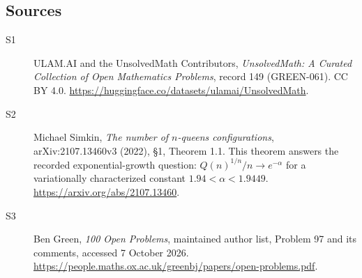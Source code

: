 \documentclass[11pt]{article}
\begin{document}
\subsection{Sources}
\begin{description}
\item[\hypertarget{source:149:1}{S1}] ULAM.AI and the UnsolvedMath Contributors, \emph{UnsolvedMath: A Curated Collection of Open Mathematics Problems}, record 149 (GREEN-061). CC BY 4.0. \url{https://huggingface.co/datasets/ulamai/UnsolvedMath}.
\item[\hypertarget{source:149:2}{S2}] Michael Simkin, \emph{The number of $n$-queens configurations}, arXiv:2107.13460v3 (2022), §1, Theorem 1.1. This theorem answers the recorded exponential-growth question: $Q(n)^{1/n}/n\to e^{-\alpha}$ for a variationally characterized constant $1.94<\alpha<1.9449$. \url{https://arxiv.org/abs/2107.13460}.
\item[\hypertarget{source:149:3}{S3}] Ben Green, \emph{100 Open Problems}, maintained author list, Problem 97 and its comments, accessed 7 October 2026. \url{https://people.maths.ox.ac.uk/greenbj/papers/open-problems.pdf}.
\end{description}
\label{end:149}
\end{document}

